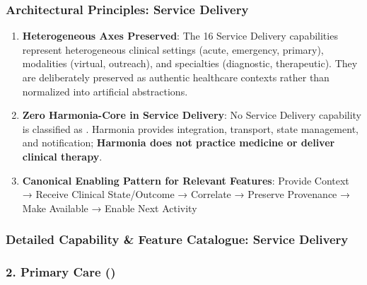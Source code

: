 \subsubsection*{Architectural Principles: Service Delivery}
\label{rad:enabling:380}

\begin{enumerate}

\item
\textbf{Heterogeneous Axes Preserved}: The 16 Service Delivery capabilities represent heterogeneous clinical settings (acute, emergency, primary), modalities (virtual, outreach), and specialties (diagnostic, therapeutic). They are deliberately preserved as authentic healthcare contexts rather than normalized into artificial abstractions.



\item
\textbf{Zero Harmonia-Core in Service Delivery}: No Service Delivery capability is classified as \texttt{}. Harmonia provides integration, transport, state management, and notification; \textbf{Harmonia does not practice medicine or deliver clinical therapy}.



\item
\textbf{Canonical Enabling Pattern for Relevant Features}: Provide Context → Receive Clinical State/\allowbreak{}Outcome → Correlate → Preserve Provenance → Make Available → Enable Next Activity



\end{enumerate}
\label{rad:enabling:385}

\par\smallskip
{}\label{rad:enabling:387}
\subsubsection*{Detailed Capability \& Feature Catalogue: Service Delivery}
\label{rad:enabling:389}
\subsubsection*{2. Primary Care (\texttt{})}
\label{rad:enabling:390}

